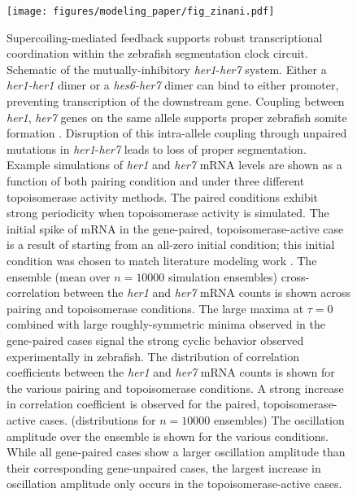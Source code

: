 \documentclass[11pt]{article}
\begin{document}
\begin{figure}[htbp]
    \centering
    {\texttt{[image: figures/modeling\_paper/fig\_zinani.pdf]}
    \label{fig:her1_her7_cartoon}
    \label{fig:zinani_summary_cartoon}
    \label{fig:zinani_mRNA_behavior}
    \label{fig:zinani_cross_correlation}
    \label{fig:zinani_correlation_coeff}
    \label{fig:zinani_oscillation_amplitude}
    }
\end{figure}
\begin{figure}[htbp]
    \ContinuedFloat
    \caption{Supercoiling-mediated feedback supports robust transcriptional coordination within the zebrafish segmentation clock circuit.
         Schematic of the mutually-inhibitory \textit{her1}-\textit{her7} system. Either a \textit{her1-her1} dimer or a \textit{hes6-her7} dimer can bind to either promoter, preventing transcription of the downstream gene.
         Coupling between \textit{her1}, \textit{her7} genes on the same allele supports proper zebrafish somite formation \parencite{zinaniPairingSegmentationClock2021}. Disruption of this intra-allele coupling through unpaired mutations in \textit{her1}-\textit{her7} leads to loss of proper segmentation.
         Example simulations of \textit{her1} and \textit{her7} mRNA levels are shown as a function of both pairing condition and under three different topoisomerase activity methods. The paired conditions exhibit strong periodicity when topoisomerase activity is simulated. The initial spike of mRNA in the gene-paired, topoisomerase-active case is a result of starting from an all-zero initial condition; this initial condition was chosen to match literature modeling work \parencite{zinaniPairingSegmentationClock2021}.
         The ensemble (mean over \(n=10000\) simulation ensembles) cross-correlation between the \textit{her1} and \textit{her7} mRNA counts is shown across pairing and topoisomerase conditions.  The large maxima at \(\tau = 0\) combined with large roughly-symmetric minima observed in the gene-paired cases signal the strong cyclic behavior observed experimentally in zebrafish.
         The distribution of correlation coefficients between the \textit{her1} and \textit{her7} mRNA counts is shown for the various pairing and topoisomerase conditions. A strong increase in correlation coefficient is observed for the paired, topoisomerase-active cases. (distributions for \(n = 10000\) ensembles)
         The oscillation amplitude over the ensemble is shown for the various conditions. While all gene-paired cases show a larger oscillation amplitude than their corresponding gene-unpaired cases, the largest increase in oscillation amplitude only occurs in the topoisomerase-active cases.
    } \label{fig:top:her1_her7}
\end{figure}
\end{document}
